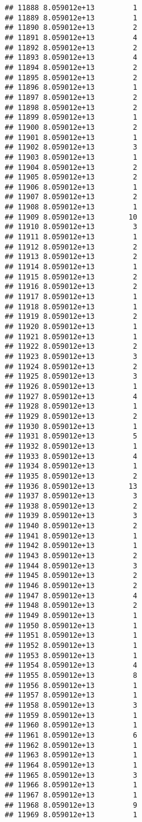 \documentclass[
]{article}
\begin{document}
\begin{verbatim}
## 11888 8.059012e+13         1
## 11889 8.059012e+13         1
## 11890 8.059012e+13         2
## 11891 8.059012e+13         4
## 11892 8.059012e+13         2
## 11893 8.059012e+13         4
## 11894 8.059012e+13         2
## 11895 8.059012e+13         2
## 11896 8.059012e+13         1
## 11897 8.059012e+13         2
## 11898 8.059012e+13         2
## 11899 8.059012e+13         1
## 11900 8.059012e+13         2
## 11901 8.059012e+13         1
## 11902 8.059012e+13         3
## 11903 8.059012e+13         1
## 11904 8.059012e+13         2
## 11905 8.059012e+13         2
## 11906 8.059012e+13         1
## 11907 8.059012e+13         2
## 11908 8.059012e+13         1
## 11909 8.059012e+13        10
## 11910 8.059012e+13         3
## 11911 8.059012e+13         1
## 11912 8.059012e+13         2
## 11913 8.059012e+13         2
## 11914 8.059012e+13         1
## 11915 8.059012e+13         2
## 11916 8.059012e+13         2
## 11917 8.059012e+13         1
## 11918 8.059012e+13         1
## 11919 8.059012e+13         2
## 11920 8.059012e+13         1
## 11921 8.059012e+13         1
## 11922 8.059012e+13         2
## 11923 8.059012e+13         3
## 11924 8.059012e+13         2
## 11925 8.059012e+13         3
## 11926 8.059012e+13         1
## 11927 8.059012e+13         4
## 11928 8.059012e+13         1
## 11929 8.059012e+13         2
## 11930 8.059012e+13         1
## 11931 8.059012e+13         5
## 11932 8.059012e+13         1
## 11933 8.059012e+13         4
## 11934 8.059012e+13         1
## 11935 8.059012e+13         2
## 11936 8.059012e+13        13
## 11937 8.059012e+13         3
## 11938 8.059012e+13         2
## 11939 8.059012e+13         3
## 11940 8.059012e+13         2
## 11941 8.059012e+13         1
## 11942 8.059012e+13         1
## 11943 8.059012e+13         2
## 11944 8.059012e+13         3
## 11945 8.059012e+13         2
## 11946 8.059012e+13         2
## 11947 8.059012e+13         4
## 11948 8.059012e+13         2
## 11949 8.059012e+13         1
## 11950 8.059012e+13         1
## 11951 8.059012e+13         1
## 11952 8.059012e+13         1
## 11953 8.059012e+13         1
## 11954 8.059012e+13         4
## 11955 8.059012e+13         8
## 11956 8.059012e+13         1
## 11957 8.059012e+13         1
## 11958 8.059012e+13         3
## 11959 8.059012e+13         1
## 11960 8.059012e+13         1
## 11961 8.059012e+13         6
## 11962 8.059012e+13         1
## 11963 8.059012e+13         1
## 11964 8.059012e+13         1
## 11965 8.059012e+13         3
## 11966 8.059012e+13         1
## 11967 8.059012e+13         1
## 11968 8.059012e+13         9
## 11969 8.059012e+13         1

\end{verbatim}
\end{document}
